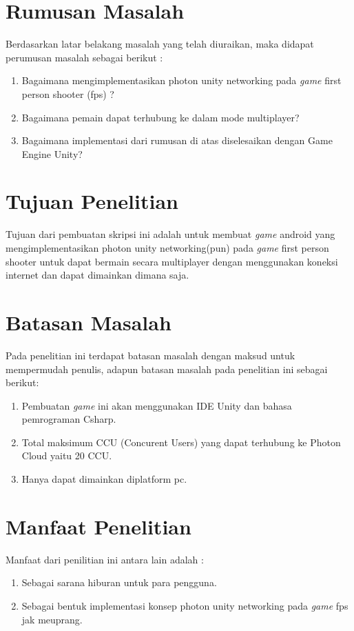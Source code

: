 \section{Rumusan Masalah}
Berdasarkan latar belakang masalah yang telah diuraikan, maka didapat perumusan masalah sebagai berikut :
\begin{enumerate}
	\item Bagaimana mengimplementasikan photon unity networking pada \textit{game} first person shooter (fps) ?
	\item Bagaimana pemain dapat terhubung ke dalam mode multiplayer?
	\item Bagaimana implementasi dari rumusan di atas diselesaikan 
	dengan Game Engine Unity?
	\end{enumerate}	
\section{Tujuan Penelitian}
Tujuan dari pembuatan skripsi ini adalah untuk membuat \textit{game} android yang mengimplementasikan photon unity networking(pun) pada \textit{game} first person shooter untuk dapat bermain secara multiplayer dengan menggunakan koneksi internet dan dapat dimainkan dimana saja.

\section{Batasan Masalah}
Pada penelitian ini terdapat batasan masalah dengan maksud untuk mempermudah penulis, adapun batasan masalah pada penelitian ini sebagai berikut:
\begin{enumerate}
	\item Pembuatan \textit{game} ini akan menggunakan IDE Unity dan bahasa pemrograman Csharp.
	\item Total maksimum CCU (Concurent Users) yang dapat terhubung ke Photon Cloud yaitu 20 CCU.
	\item Hanya dapat dimainkan diplatform pc.
\end{enumerate}

\section{Manfaat Penelitian}
Manfaat dari penilitian ini antara lain adalah : 
\begin{enumerate}
	\item Sebagai sarana hiburan untuk para pengguna.
	\item Sebagai bentuk implementasi konsep photon unity networking pada \textit{game} fps jak meuprang.
\end{enumerate}